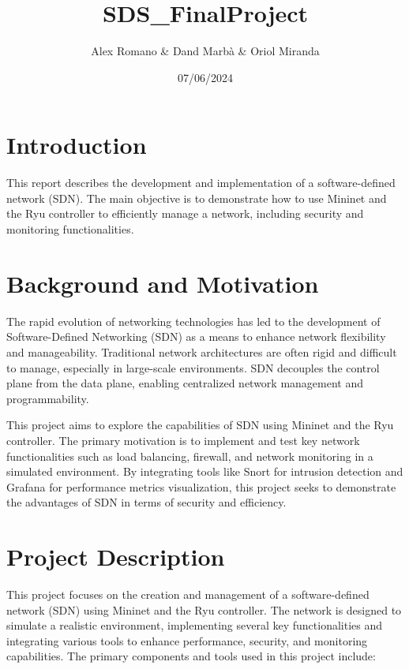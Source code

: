 \documentclass[a4paper,12pt]{article}
\title{SDS\_FinalProject}
\author{Alex Romano \& Dand Marbà \& Oriol Miranda}
\date{07/06/2024}
\begin{document}
\maketitle
\newpage
\tableofcontents
\newpage

\section{Introduction}
This report describes the development and implementation of a software-defined network (SDN). The main objective is to demonstrate how to use Mininet and the Ryu controller to efficiently manage a network, including security and monitoring functionalities.

\section{Background and Motivation}
The rapid evolution of networking technologies has led to the development of Software-Defined Networking (SDN) as a means to enhance network flexibility and manageability. Traditional network architectures are often rigid and difficult to manage, especially in large-scale environments. SDN decouples the control plane from the data plane, enabling centralized network management and programmability.

This project aims to explore the capabilities of SDN using Mininet and the Ryu controller. The primary motivation is to implement and test key network functionalities such as load balancing, firewall, and network monitoring in a simulated environment. By integrating tools like Snort for intrusion detection and Grafana for performance metrics visualization, this project seeks to demonstrate the advantages of SDN in terms of security and efficiency.

\section{Project Description}
This project focuses on the creation and management of a software-defined network (SDN) using Mininet and the Ryu controller. The network is designed to simulate a realistic environment, implementing several key functionalities and integrating various tools to enhance performance, security, and monitoring capabilities. The primary components and tools used in this project include:
\end{document}
